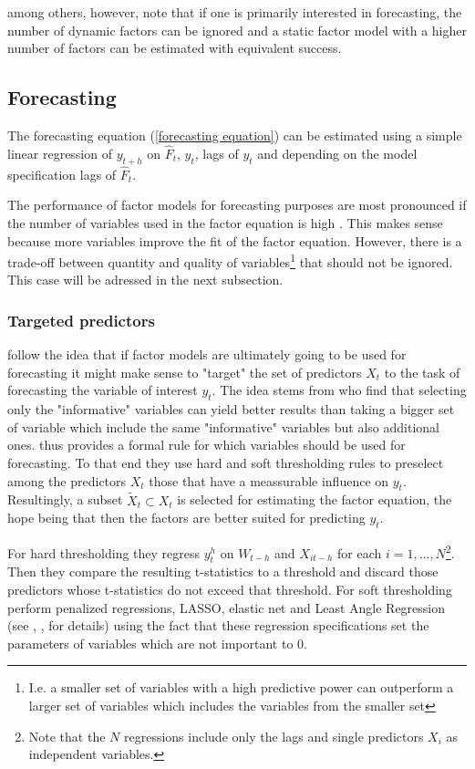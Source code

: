 \documentclass[11pt]{article}
\begin{document}
\citet{breitung2011testing} among others, however, note that if one is primarily interested in forecasting, the number of dynamic factors can be ignored and a static factor model with a higher number of factors can be estimated with equivalent success.


\subsection{Forecasting}
The forecasting equation (\ref{forecasting equation}) can be estimated using a simple linear regression of $y_{t+h}$ on $\hat F_t$, $y_t$, lags of $y_t$ and depending on the model specification lags of $\hat F_t$.

The performance of factor models for forecasting purposes are most pronounced if the number of variables used in the factor equation is high \citep{stock2010dynamic}. This makes sense because more variables improve the fit of the factor equation. However, there is a trade-off between quantity and quality of variables\footnote{I.e. a smaller set of variables with a high predictive power can outperform a larger set of variables which includes the variables from the smaller set} that should not be ignored. This case will be adressed in the next subsection.

\subsubsection{Targeted predictors}
\citet{bai2008forecasting} follow the idea that if factor models are ultimately going to be used for forecasting it might make sense to "target" the set of predictors $X_t$ to the task of forecasting the variable of interest $y_t$. The idea stems from \citet{boivin2006more} who find that selecting only the "informative" variables can yield better results than taking a bigger set of variable which include the same "informative" variables but also additional ones. \citet{bai2008forecasting} thus provides a formal rule for which variables should be used for forecasting. To that end they use hard and soft thresholding rules to preselect among the predictors $X_t$ those that have a meassurable influence on $y_t$. Resultingly, a subset $\tilde X_t \subset X_t$ is selected for estimating the factor equation, the hope being that then the factors are better suited for predicting $y_t$.

 For hard thresholding they regress $y_t^h$ on $W_{t-h}$ and $X_{it-h}$ for each $i=1, ..., N$\footnote{Note that the $N$ regressions include only the lags and single predictors $X_i$ as independent variables.}. Then they compare the resulting t-statistics to a threshold and discard those predictors whose t-statistics do not exceed that threshold. For soft thresholding \citet{bai2008forecasting} perform penalized regressions, LASSO, elastic net and Least Angle Regression (see \citet{tibshirani1996}, \citet{zou_hastie2005}, \citet{efron_hastie_johnstone_tibshirani2004} for details) using the fact that these regression specifications set the parameters of variables which are not important to $0$. \\
\end{document}
